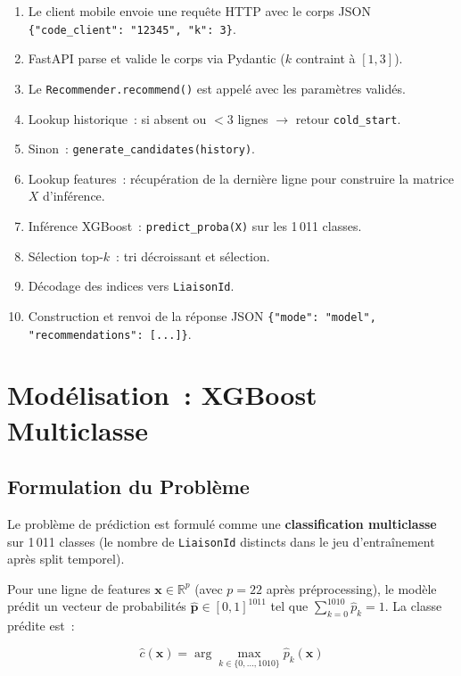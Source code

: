 \documentclass[11pt, a4paper]{article}
\begin{document}
\begin{enumerate}
\item Le client mobile envoie une requête HTTP avec le corps JSON
    \texttt{\{"code\_client": "12345", "k": 3\}}.
\item FastAPI parse et valide le corps via Pydantic ($k$ contraint à
    $[1, 3]$).
\item Le \texttt{Recommender.recommend()} est appelé avec les
    paramètres validés.
\item Lookup historique~: si absent ou $< 3$ lignes
    $\rightarrow$ retour \texttt{cold\_start}.
\item Sinon~: \texttt{generate\_candidates(history)}.
\item Lookup features~: récupération de la dernière ligne pour
    construire la matrice $X$ d'inférence.
\item Inférence XGBoost~: \texttt{predict\_proba(X)} sur les 1\,011
    classes.
\item Sélection top-$k$~: tri décroissant et sélection.
\item Décodage des indices vers \texttt{LiaisonId}.
\item Construction et renvoi de la réponse JSON
    \texttt{\{"mode": "model", "recommendations": [...]\}}.
\end{enumerate}

\newpage
\section{Modélisation~: XGBoost Multiclasse}

\subsection{Formulation du Problème}

Le problème de prédiction est formulé comme une \textbf{classification
multiclasse} sur 1\,011 classes (le nombre de \texttt{LiaisonId}
distincts dans le jeu d'entraînement après split temporel).

Pour une ligne de features $\mathbf{x} \in \mathbb{R}^p$ (avec $p =
22$ après préprocessing), le modèle prédit un vecteur de probabilités
$\hat{\mathbf{p}} \in [0,1]^{1011}$ tel que $\sum_{k=0}^{1010}
\hat{p}_k = 1$. La classe prédite est~:

\[
\hat{c}(\mathbf{x}) = \arg\max_{k \in \{0, \ldots, 1010\}} \hat{p}_k(\mathbf{x})
\]
\end{document}

